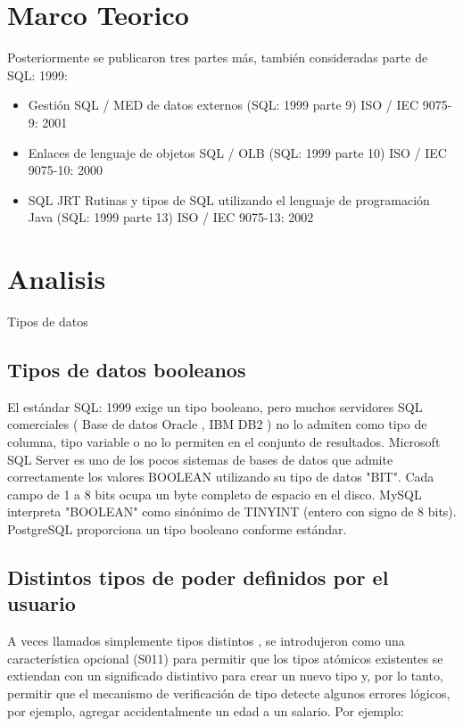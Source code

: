 \documentclass[preprint,12pt]{elsarticle}
\begin{document}



	

\section{Marco Teorico}
	

Posteriormente se publicaron tres partes más, también consideradas parte de SQL: 1999:

\begin{itemize}

\item Gestión SQL / MED de datos externos (SQL: 1999 parte 9) ISO / IEC 9075-9: 2001
\item Enlaces de lenguaje de objetos SQL / OLB (SQL: 1999 parte 10) ISO / IEC 9075-10: 2000
\item SQL JRT Rutinas y tipos de SQL utilizando el lenguaje de programación Java (SQL: 1999 parte 13) ISO / IEC 9075-13: 2002

\end{itemize}



\section{Analisis}

Tipos de datos 

\subsection{Tipos de datos booleanos }


El estándar SQL: 1999 exige un tipo booleano,  pero muchos servidores SQL comerciales ( Base de datos Oracle , IBM DB2 ) no lo admiten como tipo de columna, tipo variable o no lo permiten en el conjunto de resultados. Microsoft SQL Server es uno de los pocos sistemas de bases de datos que admite correctamente los valores BOOLEAN utilizando su tipo de datos "BIT".  Cada campo de 1 a 8 bits ocupa un byte completo de espacio en el disco. MySQL interpreta "BOOLEAN" como sinónimo de TINYINT (entero con signo de 8 bits).  PostgreSQL proporciona un tipo booleano conforme estándar. 
\subsection{Distintos tipos de poder definidos por el usuario }
A veces llamados simplemente tipos distintos , se introdujeron como una característica opcional (S011) para permitir que los tipos atómicos existentes se extiendan con un significado distintivo para crear un nuevo tipo y, por lo tanto, permitir que el mecanismo de verificación de tipo detecte algunos errores lógicos, por ejemplo, agregar accidentalmente un edad a un salario. Por ejemplo:
\end{document}
